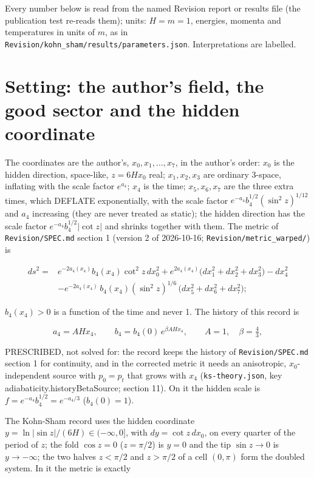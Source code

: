 \documentclass[11pt]{article}
\begin{document}
Every number below is read from the named Revision report or results file (the publication test re-reads them); units: $H = m = 1$, energies, momenta and temperatures in units of $m$, as in \texttt{Revision\allowbreak{}/kohn\_sh\allowbreak{}am/resul\allowbreak{}ts/param\allowbreak{}eters.js\allowbreak{}on}. Interpretations are labelled.

\section{Setting: the author's field, the good sector and the hidden coordinate}

The coordinates are the author's, $x_0, x_1, \dots, x_7$, in the author's order: $x_0$ is the hidden direction, space-like, $z = 6Hx_0$ real; $x_1, x_2, x_3$ are ordinary 3-space, inflating with the scale factor $e^{a_4}$; $x_4$ is the time; $x_5, x_6, x_7$ are the three extra times, which DEFLATE exponentially, with the scale factor $e^{-a_4}b_4^{1/2}(\sin^2 z)^{1/12}$ and $a_4$ increasing (they are never treated as static); the hidden direction has the scale factor $e^{-a_4}b_4^{1/2}|\cot z|$ and shrinks together with them. The metric of \texttt{Revision\allowbreak{}/SPEC.md} section 1 (version 2 of 2026-10-16; \texttt{Revision\allowbreak{}/metric\_\allowbreak{}warped/}) is

\[
\begin{aligned}
ds^2 = {} & e^{-2a_4(x_4)}b_4(x_4)\cot^2 z\,dx_0^2 + e^{2a_4(x_4)}\big(dx_1^2+dx_2^2+dx_3^2\big) - dx_4^2 \\
& - e^{-2a_4(x_4)}\,b_4(x_4)(\sin^2 z)^{1/6}\,\big(dx_5^2+dx_6^2+dx_7^2\big) ;
\end{aligned}
\]

$b_4(x_4) > 0$ is a function of the time and never 1. The history of this record is

\[
a_4 = AHx_4,\qquad b_4 = b_4(0)\,e^{\beta AHx_4},\qquad A = 1,\quad \beta = \tfrac43 ,
\]

PRESCRIBED, not solved for: the record keeps the history of \texttt{Revision\allowbreak{}/SPEC.md} section 1 for continuity, and in the corrected metric it needs an anisotropic, $x_0$-independent source with $p_0 = p_t$ that grows with $x_4$ (\texttt{ks-theor\allowbreak{}y.json}, key adiabaticity.historyBetaSource; section 11). On it the hidden scale is $f = e^{-a_4}b_4^{1/2} = e^{-a_4/3}$ ($b_4(0) = 1$).

The Kohn-Sham record uses the hidden coordinate $y = \ln|\sin z|/(6H) \in (-\infty, 0]$, with $dy = \cot z\,dx_0$, on every quarter of the period of $z$; the fold $\cos z = 0$ ($z = \pi/2$) is $y = 0$ and the tip $\sin z \to 0$ is $y \to -\infty$; the two halves $z < \pi/2$ and $z > \pi/2$ of a cell $(0, \pi)$ form the doubled system. In it the metric is exactly
\end{document}
